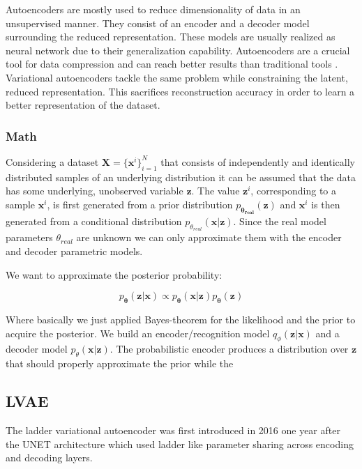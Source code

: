 \documentclass[11pt, english]{article}
\begin{document}
\par Autoencoders are mostly used to reduce dimensionality of data in an unsupervised manner. They consist of an encoder and a decoder model surrounding the reduced representation. These models are usually realized as neural network due to their generalization capability. Autoencoders are a crucial tool for data compression and can reach better results than traditional tools \cite{theis2017lossy}. Variational autoencoders tackle the same problem while constraining the latent, reduced representation. This sacrifices reconstruction accuracy in order to learn a better representation of the dataset.

\subsubsection{Math}

\par Considering a dataset $\boldsymbol{X} = \big\{\boldsymbol{x}^{i}\big\}_{i = 1}^{N}$ that consists of independently and identically distributed samples of an underlying distribution it can be assumed that the data has some underlying, unobserved variable $\boldsymbol{z}$. The value $\boldsymbol{z}^{i}$, corresponding to a sample $\boldsymbol{x}^{i}$, is first generated from a prior distribution $p_{\boldsymbol{\theta_{real}}}(\boldsymbol{z})$ and $\boldsymbol{x}^{i}$ is then generated from a conditional distribution $p_{\theta_{real}}(\boldsymbol{x} | \boldsymbol{z})$. Since the real model parameters $\theta_{real}$ are unknown we can only approximate them with the encoder and decoder parametric models.
\par We want to approximate the posterior probability:

\begin{equation}
    p_{\boldsymbol{\theta}}(\boldsymbol{z} | \boldsymbol{x}) \propto p_{\boldsymbol{\theta}}(\boldsymbol{x} | \boldsymbol{z}) p_{\boldsymbol{\theta}}(\boldsymbol{z})
\end{equation}

\par Where basically we just applied Bayes-theorem for the likelihood and the prior to acquire the posterior. We build an encoder/recognition model $q_{\phi}(\boldsymbol{z} | \boldsymbol{x})$ and a decoder model $p_{\theta}(\boldsymbol{x} | \boldsymbol{z})$. The probabilistic encoder produces a distribution over $\boldsymbol{z}$ that should properly approximate the prior while the 

\subsection{LVAE}

\par The ladder variational autoencoder was first introduced in 2016 \cite{sonderby2016ladder} one year after the UNET \cite{ronneberger2015u} architecture which used ladder like parameter sharing across encoding and decoding layers.

\par 

\newpage
\printbibliography
\end{document}

